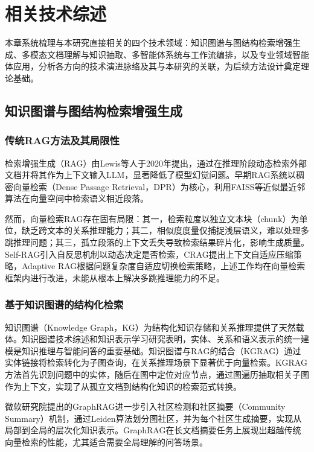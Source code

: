 \section{相关技术综述}

本章系统梳理与本研究直接相关的四个技术领域：知识图谱与图结构检索增强生成、多模态文档理解与知识抽取、多智能体系统与工作流编排，以及专业领域智能体应用，分析各方向的技术演进脉络及其与本研究的关联，为后续方法设计奠定理论基础。

\subsection{知识图谱与图结构检索增强生成}

\subsubsection{传统RAG方法及其局限性}

检索增强生成（RAG）由Lewis等人\cite{lewis2020retrieval}于2020年提出，通过在推理阶段动态检索外部文档并将其作为上下文输入LLM，显著降低了模型幻觉问题。早期RAG系统以稠密向量检索（Dense Passage Retrieval，DPR）为核心，利用FAISS等近似最近邻算法在向量空间中检索语义相近段落。

然而，向量检索RAG存在固有局限：其一，检索粒度以独立文本块（chunk）为单位，缺乏跨文本的关系推理能力；其二，相似度度量仅捕捉浅层语义，难以处理多跳推理问题；其三，孤立段落的上下文丢失导致检索结果碎片化，影响生成质量。Self-RAG\cite{asai2023selfrag}引入自反思机制以动态决定是否检索，CRAG\cite{yan2024crag}提出上下文自适应压缩策略，Adaptive RAG\cite{jeong2024adaptive}根据问题复杂度自适应切换检索策略，上述工作均在向量检索框架内进行改进，未能从根本上解决多跳推理能力的不足。

\subsubsection{基于知识图谱的结构化检索}

知识图谱（Knowledge Graph，KG）为结构化知识存储和关系推理提供了天然载体。知识图谱技术综述\cite{xu2016kgreview}和知识表示学习研究\cite{liu2016krl}表明，实体、关系和语义表示的统一建模是知识推理与智能问答的重要基础。知识图谱与RAG的结合（KGRAG）\cite{kgrag2023}通过实体链接将检索转化为子图查询，在关系推理场景下显著优于向量检索。KGRAG方法首先识别问题中的实体，随后在图中定位对应节点，通过图遍历抽取相关子图作为上下文，实现了从孤立文档到结构化知识的检索范式转换。

微软研究院提出的GraphRAG\cite{edge2024graphrag}进一步引入社区检测和社区摘要（Community Summary）机制，通过Leiden算法划分图社区，并为每个社区生成摘要，实现从局部到全局的层次化知识表示。GraphRAG在长文档摘要任务上展现出超越传统向量检索的性能，尤其适合需要全局理解的问答场景。

